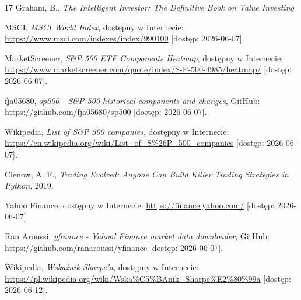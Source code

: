 \documentclass[12pt, a4paper]{article}
\begin{document}
\begin{thebibliography}{17}
Graham, B., \textit{The Intelligent Investor: The Definitive Book on Value Investing}

MSCI, \textit{MSCI World Index}, dostępny w Internecie: \url{https://www.msci.com/indexes/index/990100} [dostęp: 2026-06-07].

MarketScreener, \textit{S\&P 500 ETF Components Heatmap}, dostępny w Internecie: \url{https://www.marketscreener.com/quote/index/S-P-500-4985/heatmap/} [dostęp: 2026-06-07].

fja05680, \textit{sp500 - S\&P 500 historical components and changes}, GitHub: \url{https://github.com/fja05680/sp500} [dostęp: 2026-06-07].

Wikipedia, \textit{List of S\&P 500 companies}, dostępny w Internecie: \url{https://en.wikipedia.org/wiki/List_of_S\%26P_500_companies} [dostęp: 2026-06-07].

Clenow, A. F., \textit{Trading Evolved: Anyone Can Build Killer Trading Strategies in Python}, 2019.

Yahoo Finance, dostępny w Internecie: \url{https://finance.yahoo.com/} [dostęp: 2026-06-07].

Ran Aroussi, \textit{yfinance - Yahoo! Finance market data downloader}, GitHub: \url{https://github.com/ranaroussi/yfinance} [dostęp: 2026-06-07].

Wikipedia, \textit{Wskaźnik Sharpe’a}, dostępny w Internecie: \url{https://pl.wikipedia.org/wiki/Wska\%C5\%BAnik_Sharpe\%E2\%80\%99a} [dostęp: 2026-06-12].

\end{thebibliography}
\end{document}
